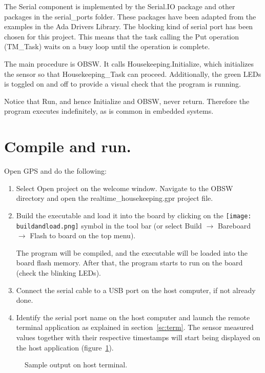 The Serial component is implemented by the Serial.IO package and other packages in the serial\_ports folder. These packages have been adapted from the examples in the Ada Drivers Library. The blocking kind of serial port has been chosen for this project. This means that the task calling the Put operation (TM\_Task) waits on a busy loop until the operation is complete.

The main procedure is OBSW. It calls Housekeeping.Initialize, which initializes the sensor so that Housekeeping\_Task can proceed.
Additionally, the green LEDs is toggled on and off to provide a visual check that the program is running.

Notice that Run, and hence Initialize and OBSW, never return. Therefore the program executes indefinitely, as is common in embedded systems.

\section{Compile and run.}

Open GPS and do the following:
\begin{enumerate}
\item Select Open project on the welcome window. Navigate to the OBSW directory and open the realtime\_housekeeping.gpr project file.
\item Build the executable and load it into the board by clicking on the \hbox{\texttt{[image: buildandload.png]}} symbol in the tool bar (or select Build $\rightarrow$ Bareboard $\rightarrow$ Flash to board on the top menu).

The program will be compiled, and the executable will be loaded into the board flash memory. After that, the program starts to run on the board (check the blinking LEDs).
\item Connect the serial cable to a USB port on the host computer, if not already done.
\item Identify the serial port name on the host computer and launch the remote terminal application as explained in section~\ref{sc:term}. The sensor measured values together with their respective timestamps will start being displayed on the host application (figure~\ref{fig:output}).
\end{enumerate}

\begin{figure}[h]
            \caption{Sample output on host terminal.}
            \label{fig:output}
\end{figure}

